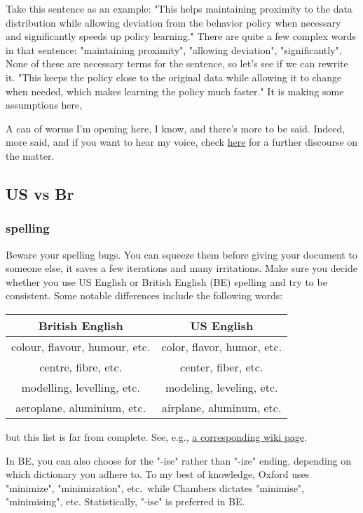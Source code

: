 \documentclass{article}
\begin{document}
Take this sentence as an example: "This helps maintaining proximity to the data distribution while allowing deviation from the behavior policy when necessary and significantly speeds up policy learning." There are quite a few complex words in that sentence: "maintaining proximity", "allowing deviation", "significantly".  None of these are necessary terms for the sentence, so let's see if we can rewrite it.
"This keeps the policy close to the original data while allowing it to change when needed, which makes learning the policy much faster."  It is making some assumptions here, 

A can of worms I'm opening here, I know, and there's more to be said.  Indeed, more said, and if you want to hear my  voice, check
\href{https://smagt.github.io/readable\%20paper\%20writing.html}{here} for a further discourse on the matter.


\subsection{US vs Br}
\subsubsection{spelling}

Beware your spelling bugs.  You can squeeze them before giving your document to someone else, it saves a few iterations and many irritations.  Make sure you decide whether you use US English or British English (BE) spelling and try to be consistent.
Some notable differences include the following words:
\begin{center}\begin{tabular}{c|c}
British English & US English \\\hline
colour, flavour, humour, etc.	& color, flavor, humor, etc.\\
centre, fibre, etc.	& center, fiber, etc.\\
modelling, levelling, etc.		& modeling, leveling, etc.\\
aeroplane, aluminium, etc.			& airplane, aluminum, etc.
\end{tabular}\end{center}
but this list is far from complete.  See, e.g., \href{http://en.wikipedia.org/wiki/American_and_British_English_spelling_differences}{a corresponding wiki page}.

In BE, you can also choose for the "-ise" rather than "-ize" ending, depending on which dictionary you adhere to.  To my best of knowledge, Oxford uses "minimize", "minimization", etc.\ while Chambers dictates "minimise", "minimising", etc.  Statistically, "-ise" is preferred in BE.
\end{document}
